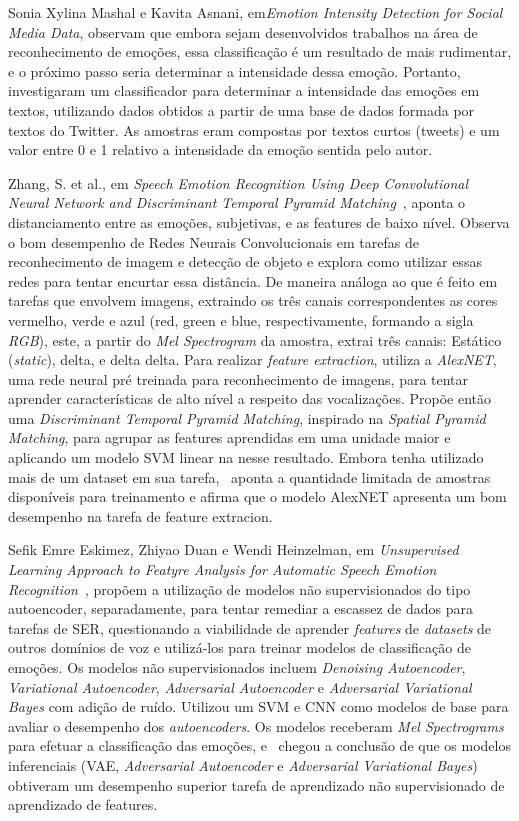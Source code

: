 Sonia Xylina Mashal e Kavita Asnani, em\textit{Emotion Intensity Detection for Social Media Data}\cite{14}, observam que embora sejam desenvolvidos trabalhos na área de reconhecimento de emoções, essa classificação é um resultado de mais rudimentar, e o próximo passo seria determinar a intensidade dessa emoção. Portanto, investigaram um classificador para determinar a intensidade das emoções em textos, utilizando dados obtidos a partir de uma base de dados formada por textos do Twitter. As amostras eram compostas por textos curtos (tweets) e um valor entre 0 e 1 relativo a intensidade da emoção sentida pelo autor.

Zhang, S. et al., em \textit{Speech Emotion Recognition Using Deep Convolutional Neural Network and Discriminant Temporal Pyramid Matching}~\cite{32.25}, aponta o distanciamento entre as emoções, subjetivas, e as features de baixo nível. Observa o bom desempenho de Redes Neurais Convolucionais em tarefas de reconhecimento de imagem e detecção de objeto e explora como utilizar essas redes para tentar encurtar essa distância. De maneira análoga ao que é feito em tarefas que envolvem imagens, extraindo os três canais correspondentes as cores vermelho, verde e azul (red, green e blue, respectivamente, formando a sigla \textit{RGB}), este, a partir do \textit{Mel Spectrogram} da amostra, extrai três canais: Estático (\textit{static}), delta, e delta delta. Para realizar \textit{feature extraction}, utiliza a \textit{AlexNET}, uma rede neural pré treinada para reconhecimento de imagens, para tentar aprender características de alto nível a respeito das vocalizações. Propõe então uma \textit{Discriminant Temporal Pyramid Matching}, inspirado na \textit{Spatial Pyramid Matching}, para agrupar as features aprendidas em uma unidade maior e aplicando um modelo \acrshort{SVM} linear na nesse resultado. Embora tenha utilizado mais de um dataset em sua tarefa,~\cite{32.25} aponta a quantidade limitada de amostras disponíveis para treinamento e afirma que o modelo AlexNET apresenta um bom desempenho na tarefa de feature extracion.

Sefik Emre Eskimez, Zhiyao Duan e Wendi Heinzelman, em \textit{Unsupervised Learning Approach to Featyre Analysis for Automatic Speech Emotion Recognition}~\cite{34}, propõem a utilização de modelos não supervisionados do tipo autoencoder, separadamente, para tentar remediar a escassez de dados para tarefas de \acrshort{SER}, questionando a viabilidade de aprender \textit{features} de \textit{datasets} de outros domínios de voz e utilizá-los para treinar modelos de classificação de emoções. Os modelos não supervisionados incluem\textit{ Denoising Autoencoder}, \textit{Variational Autoencoder}, \textit{Adversarial Autoencoder} e \textit{Adversarial Variational Bayes} com adição de ruído. Utilizou um \acrshort{SVM} e \acrshort{CNN} como modelos de base para avaliar o desempenho dos \textit{autoencoders}. Os modelos receberam \textit{Mel Spectrograms} para efetuar a classificação das emoções, e~\cite{34} chegou a conclusão de que os modelos inferenciais (\acrshort{VAE}, \textit{Adversarial Autoencoder} e \textit{Adversarial Variational Bayes}) obtiveram um desempenho superior tarefa de aprendizado não supervisionado de aprendizado de features.

